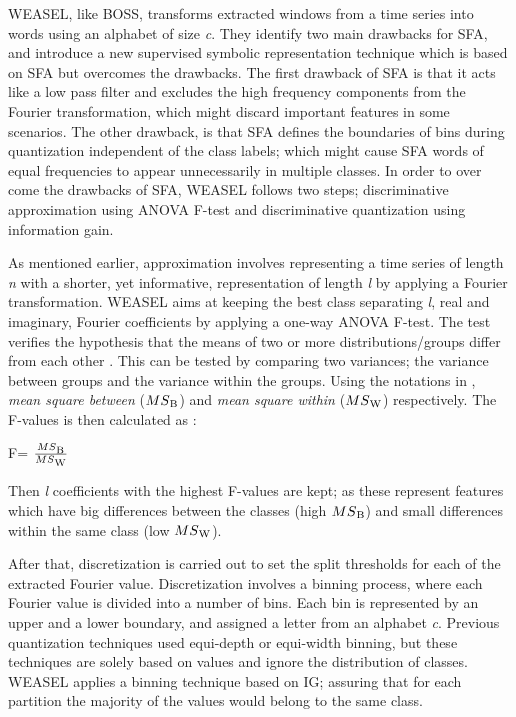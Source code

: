WEASEL, like BOSS, transforms extracted windows from a time series into words using an alphabet of size \emph{c}.
They identify two main drawbacks for SFA, and introduce a new supervised symbolic representation technique which is based on SFA but overcomes the drawbacks.
The first drawback of SFA is that it acts like a low pass filter and excludes the high frequency components from the Fourier transformation,
which might discard important features in some scenarios. The other drawback, is that SFA defines the boundaries of bins during quantization
independent of the class labels; which might cause SFA words of equal frequencies to appear unnecessarily in multiple classes.
In order to over come the drawbacks of SFA, WEASEL follows two steps;
discriminative approximation using ANOVA F-test and discriminative quantization using information gain.

As mentioned earlier, approximation involves representing a time series of length \emph{n} with a shorter, yet informative, representation of length \emph{l} by applying a Fourier transformation.
WEASEL aims at keeping the best class separating \emph{l}, real and imaginary, Fourier coefficients by applying a one-way ANOVA F-test.
The test verifies the hypothesis that the means of two or more distributions/groups differ from each other \cite{lowry2014concepts}.
This can be tested by comparing two variances; the variance between groups and the variance within the groups.
Using the notations in \cite{schafer2017fast}, \emph{mean square between} ($MS\textsubscript{B}$) and \emph{mean square within} ($MS\textsubscript{W}$) respectively.
The F-values is then calculated as :
\begin{definition}
    \centerline{F= $\frac{MS\textsubscript{B}}{MS\textsubscript{W}}$}
\end{definition}
Then \emph{l} coefficients with the highest F-values are kept; as these represent features which have big differences between the classes (high $MS\textsubscript{B}$) and
small differences within the same class (low $MS\textsubscript{W}$).

After that, discretization is carried out to set the split thresholds for each of the extracted Fourier value.
Discretization involves a binning process, where each Fourier value is divided into a number of bins.
Each bin is represented by an upper and a lower boundary, and assigned a letter from an alphabet \emph{c}.
Previous quantization techniques used equi-depth or equi-width binning, but these techniques are solely based on values and ignore the distribution of classes.
WEASEL applies a binning technique based on IG; assuring that for each partition the majority of the values would belong to the same class.

